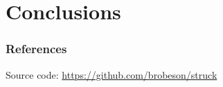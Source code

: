\section{Conclusions}


\begin{frame}
    \frametitle{References}
    
    

    Source code: \url{https://github.com/brobeson/struck}
\end{frame}
